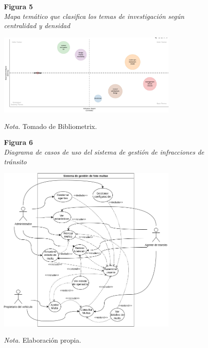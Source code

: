 \documentclass[
    letterpaper, 
    man,   
    spanish,
    12pt,
    donotrepeattitle,
    floatsintext,
    hidelinks %
]{apa7}
\begin{document}
\begin{figure}[htbp]
    \begin{flushleft}
        \textbf{Figura 5}\\
        \textit{Mapa temático que clasifica los temas de investigación según centralidad y densidad}
    \end{flushleft}
    \centering
    \includegraphics[width=0.8\textwidth]{Images/MapaTematico.jpeg}
    \vspace{0.5em}
    \begin{flushleft}
        \textit{Nota.} Tomado de Bibliometrix.
    \end{flushleft}
    \label{fig:mapa_tematico}
\end{figure}

\begin{figure}[htbp]
    \begin{flushleft}
        \textbf{Figura 6}\\
        \textit{Diagrama de casos de uso del sistema de gestión de infracciones de tránsito}
    \end{flushleft}
    \centering
    \includegraphics[width=0.8\textwidth]{Images/CasosUso.png}
    \vspace{0.5em}
    \begin{flushleft}
        \textit{Nota.} Elaboración propia.
    \end{flushleft}
    \label{fig:casos_uso}
\end{figure}
\end{document}

